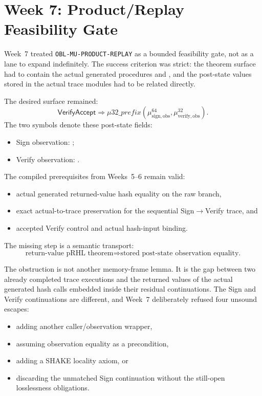 \section{Week 7: Product/Replay Feasibility Gate}

Week~7 treated \texttt{OBL-MU-PRODUCT-REPLAY} as a bounded feasibility gate,
not as a lane to expand indefinitely. The success criterion was strict:
the theorem surface had to contain the actual generated procedures
 and
, and the post-state values
stored in the actual trace modules had to be related directly.

The desired surface remained:
\[
  \mathsf{VerifyAccept}
  \Longrightarrow
  \mu32\_prefix(\mu^{64}_{\mathrm{sign,obs}},
                 \mu^{32}_{\mathrm{verify,obs}}).
\]
The two symbols denote these post-state fields:
\begin{itemize}
\item Sign observation: ;
\item Verify observation: .
\end{itemize}

The compiled prerequisites from Weeks~5--6 remain valid:
\begin{itemize}
\item actual generated returned-value hash equality on the raw branch,
\item exact actual-to-trace preservation for the sequential Sign$\rightarrow$Verify
trace, and
\item accepted Verify control and actual hash-input binding.
\end{itemize}

The missing step is a semantic transport:
\[
  \text{return-value pRHL theorem}
  \Longrightarrow
  \text{stored post-state observation equality.}
\]

The obstruction is not another memory-frame lemma. It is the gap between two
already completed trace executions and the returned values of the actual
generated hash calls embedded inside their residual continuations. The Sign and
Verify continuations are different, and Week~7 deliberately refused four
unsound escapes:
\begin{itemize}
\item adding another caller/observation wrapper,
\item assuming observation equality as a precondition,
\item adding a SHAKE locality axiom, or
\item discarding the unmatched Sign continuation without the still-open
losslessness obligations.
\end{itemize}

